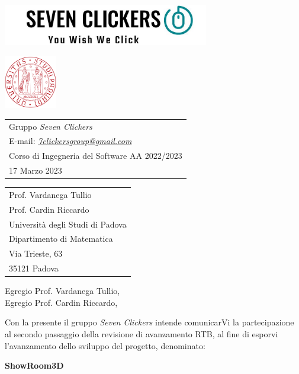 \documentclass[10pt]{article}
\begin{document}
\noindent\begin{minipage}{0.5\textwidth}%
\includegraphics[width=9cm]{images/logo.jpeg}
\end{minipage}%
\hfill%
\begin{minipage}{4cm}
\includegraphics[width=2.3cm]{images/uni.png}
\end{minipage}

\bigskip\bigskip

\begin{tabular}{ @{} l  }
  Gruppo \textit{Seven Clickers} \\ 
  E-mail: \textit{\href{mailto:7clickersgroup@gmail.com}{7clickersgroup@gmail.com} }\\ 
  Corso di Ingegneria del Software AA 2022/2023 \\
  17 Marzo 2023
\end{tabular}

\bigskip
\hfill
\begin{tabular}{ l @{} }
Prof. Vardanega Tullio\\
Prof. Cardin Riccardo\\
Università degli Studi di Padova\\
Dipartimento di Matematica\\
Via Trieste, 63\\
35121 Padova
\end{tabular}

\bigskip

Egregio Prof. Vardanega Tullio,\\
Egregio Prof. Cardin Riccardo,\\

\bigskip

Con la presente il gruppo \textit{Seven Clickers} intende comunicarVi la partecipazione al secondo passaggio della revisione di avanzamento RTB,
al fine di esporvi l’avanzamento dello sviluppo del progetto, denominato:

\begin{center}
  \textbf{ShowRoom3D}
\end{center}
\end{document}
